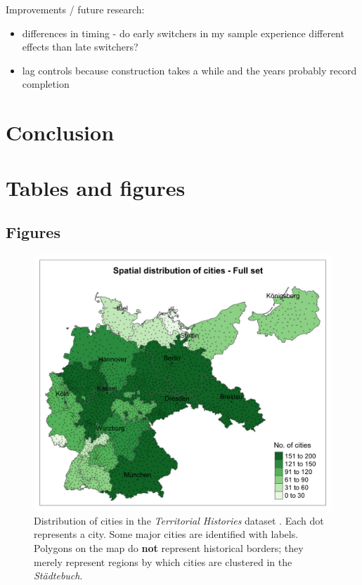 \documentclass[11pt, a4paper]{article}
\begin{document}
Improvements / future research:
\begin{itemize}
    \item differences in timing - do early switchers in my sample experience different effects than late switchers?
    \item lag controls because construction takes a while and the years probably record completion
\end{itemize}



\section{Conclusion} \label{sec:conclusion}

\newpage
\onehalfspacing



\newpage
\section*{Tables and figures}



\subsection*{Figures}

\begin{figure}[ht]
    \centering
    \includegraphics[scale=0.15]{paper/output/descriptive/map_cities_raw.png}
    \caption{Distribution of cities in the \textit{Territorial Histories} dataset \citep{pt2}. Each dot represents a city. Some major cities are identified with labels. Polygons on the map do \textbf{not} represent historical borders; they merely represent regions by which cities are clustered in the \textit{Städtebuch}.}
    \label{fig:map_cities_raw}
\end{figure}
\end{document}
